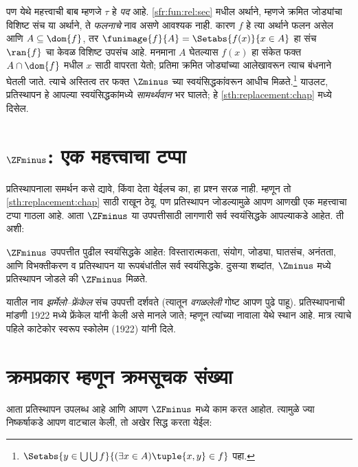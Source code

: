 पण येथे महत्त्वाची बाब म्हणजे $\tau$ हे \emph{पद} आहे. \ref{sfr:fun:rel:sec} मधील अर्थाने, म्हणजे क्रमित जोड्यांचा विशिष्ट संच या अर्थाने, ते \emph{फलनाचे} नाव असणे आवश्यक नाही. कारण $f$ हे त्या अर्थाने फलन असेल आणि $A\subseteq\dom{f}$,
तर $\funimage{f}{A}=\Setabs{f(x)}{x\in A}$ हा संच $\ran{f}$ चा
केवळ विशिष्ट उपसंच आहे. मनमाना $A$ घेतल्यास $f(x)$ हा संकेत
फक्त $A\cap\dom{f}$ मधील $x$ साठी वापरता येतो; प्रतिमा
क्रमित जोड्यांच्या आलेखावरून त्याच बंधनाने घेतली जाते. त्याचे अस्तित्व तर फक्त $\Zminus$ च्या स्वयंसिद्धकांवरून आधीच मिळते.\footnote{$\Setabs{y\in\bigcup\bigcup f}{(\exists x\in A)\tuple{x,y}\in f}$ पहा.} याउलट, प्रतिस्थापन हे आपल्या स्वयंसिद्धकांमध्ये \emph{सामर्थ्यवान} भर घालते; हे \ref{sth:replacement:chap} मध्ये दिसेल.






\section{$\ZFminus$: एक महत्त्वाचा टप्पा}\label{sth:ordinals:zfm:sec}

प्रतिस्थापनाला समर्थन कसे द्यावे, किंवा देता येईलच का, हा प्रश्न सरळ नाही. म्हणून तो \ref{sth:replacement:chap} साठी राखून ठेवू. पण प्रतिस्थापन जोडल्यामुळे आपण आणखी एक महत्त्वाचा टप्पा गाठला आहे. आता $\ZFminus$ या उपपत्तीसाठी लागणारी सर्व स्वयंसिद्धके आपल्याकडे आहेत. ती अशी:

\begin{defn}
$\ZFminus$ उपपत्तीत पुढील स्वयंसिद्धके आहेत: विस्तारात्मकता, संयोग, जोड्या, घातसंच, अनंतता, आणि विभक्तीकरण व प्रतिस्थापन या रूपबंधांतील सर्व स्वयंसिद्धके. दुसऱ्या शब्दांत, $\Zminus$ मध्ये प्रतिस्थापन जोडले की $\ZFminus$ मिळते.
\end{defn}
\noindent
यातील नाव \emph{झर्मेलो--फ्रेंकेल} संच उपपत्ती दर्शवते (त्यातून \emph{वगळलेली} गोष्ट आपण पुढे पाहू). प्रतिस्थापनाची मांडणी 1922 मध्ये फ्रेंकेल यांनी केली असे मानले जाते; म्हणून त्यांच्या नावाला येथे स्थान आहे. मात्र त्याचे पहिले काटेकोर स्वरूप स्कोलेम (1922) यांनी दिले.







\section{क्रमप्रकार म्हणून क्रमसूचक संख्या}\label{sth:ordinals:ordtype:sec}

आता प्रतिस्थापन उपलब्ध आहे आणि आपण $\ZFminus$ मध्ये काम करत आहोत. त्यामुळे ज्या निष्कर्षाकडे आपण वाटचाल केली, तो अखेर सिद्ध करता येईल:


